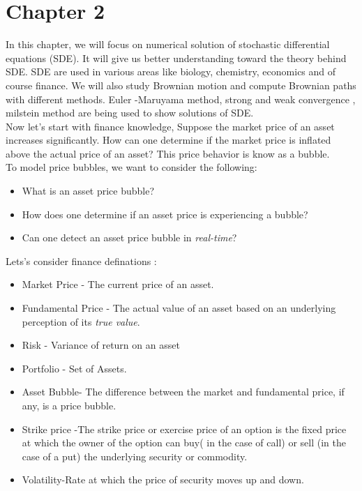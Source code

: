 
\section{Chapter 2}
 In this chapter, we will focus on numerical solution of stochastic differential equations (SDE). It will give us better understanding toward the theory behind SDE. SDE are used in various areas like biology, chemistry, economics and of course finance. We will also study Brownian motion and compute Brownian paths with different methods. Euler -Maruyama method, strong and weak convergence , milstein method are being used to show solutions of SDE. \\
 Now let's start with finance knowledge, Suppose the market price of an asset increases significantly.  How can one determine if the market price is inflated
above the actual price of an asset? This price behavior is know as a bubble.\\
To model price bubbles, we want to consider the following:
\begin{itemize}
\item What is an asset price bubble?
\item How does one determine if an asset price is experiencing a bubble?
\item Can one detect an asset price bubble in \textit{real-time}?
\end{itemize}
Lets's consider finance definations :\\
\begin{itemize}
\item Market Price - The current price of an asset.
\item Fundamental Price - The actual value of an asset based on an underlying perception of its \textit{true value}.
\item Risk - Variance of return on an asset 
\item Portfolio - Set of Assets.

\item Asset Bubble- The difference between the market and fundamental price, if any, is a price bubble.
 
 \item Strike price -The strike price or exercise price of an option is the fixed price at which the owner of the option can buy( in the case of call) or sell (in the case of a put) the underlying security or commodity.

\item Volatility-Rate at which the price of security moves up and down.
\end{itemize} 
